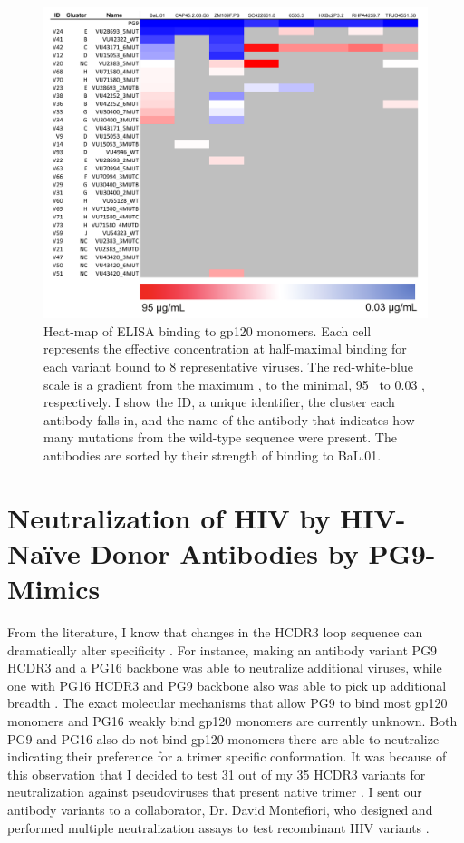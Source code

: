 \begin{figure}[!ht]
   \centering
   \includegraphics[width=.99\linewidth]{images/chapter3/figure3_17.pdf} %
   \caption[Heat-Map of ELISA Binding to gp120 Monomers]{Heat-map of ELISA binding to gp120 monomers. Each cell represents the effective concentration at half-maximal binding for each variant bound to 8 representative viruses. The red-white-blue scale is a gradient from the maximum \ec, to the minimal, 95 \mcml~to 0.03 \mcml, respectively. I show the ID, a unique identifier, the cluster each antibody falls in, and the name of the antibody that indicates how many mutations from the wild-type sequence were present. The antibodies are sorted by their strength of binding to BaL.01.}
   \label{fig:figure3_17}
\end{figure}

\section{Neutralization of HIV by HIV-Na\"{i}ve Donor Antibodies by PG9-Mimics}
From the literature, I know that changes in the HCDR3 loop sequence can dramatically alter specificity \citep{Pancera:2010hh,Pejchal:2010fp,Pancera:2013ev}. For instance, making an antibody variant PG9 HCDR3 and a PG16 backbone was able to neutralize additional viruses, while one with PG16 HCDR3 and PG9 backbone also was able to pick up additional breadth \citep{Pejchal:2010fp}.
The exact molecular mechanisms that allow PG9 to bind most gp120 monomers and PG16 weakly bind gp120 monomers are currently unknown\citep{McLellan:2011dg}. Both PG9 and PG16 also do not bind gp120 monomers there are able to neutralize indicating their preference for a trimer specific conformation. It was because of this observation that I decided to test 31 out of my 35 HCDR3 variants for neutralization against pseudoviruses that present native trimer \citep{Montefiori:2005jt}. I sent our antibody variants to a collaborator, Dr. David Montefiori, who designed and performed multiple neutralization assays to test recombinant HIV variants \citep{DeCamp:2014jd}.

